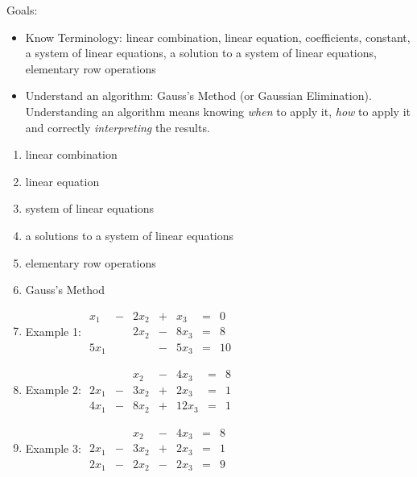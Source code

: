 \documentclass[11pt,fleqn]{article}
\begin{document}
\renewcommand{\headrulewidth}{0pt}
\newcommand{\blank}[1]{\rule{#1}{0.75pt}}
\renewcommand{\d}{\displaystyle}
\vspace*{-0.7in}
\begin{center}
  \large {}
\end{center}
Goals:
\begin{itemize}
\item Know Terminology: linear combination, linear equation, coefficients, constant, a system of linear equations, a solution to a system of linear equations, elementary row operations
\item Understand an algorithm: Gauss's Method (or Gaussian Elimination). Understanding an algorithm means knowing \emph{when} to apply it, \emph{how} to apply it and correctly \emph{interpreting} the results. 
\end{itemize}
\begin{enumerate}
\item linear combination\\
\vspace{.5in}
\item linear equation\\
\vspace{.5in}
\item system of linear equations\\
\vspace{1in}
\item a solutions to a system of linear equations\\
\vspace{.5in}
\item elementary row operations\\
\vspace{.5in}
\item Gauss's Method \\
\vfill
\newpage
\item Example 1: \quad \quad $\begin{matrix}
x_1&-&2x_2&+&x_3&=&0\\
&&2x_2&-&8x_3&=&8\\
5x_1&&&-&5x_3&=&10
\end{matrix}$
\vfill
\item Example 2: \quad \quad $\begin{matrix}
&&x_2&-&4x_3&=&8\\
2x_1&-&3x_2&+&2x_3&=&1\\
4x_1&-&8x_2&+&12x_3&=&1
\end{matrix}$

\vfill
\item Example 3: \quad \quad $\begin{matrix}
&&x_2&-&4x_3&=&8\\
2x_1&-&3x_2&+&2x_3&=&1\\
2x_1&-&2x_2&-&2x_3&=&9
\end{matrix}$

\vfill
\end{enumerate}
\end{document}

